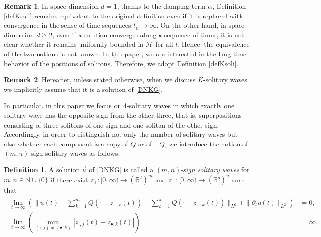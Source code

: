 \documentclass[reqno]{amsart}
\theoremstyle{plain}
\theoremstyle{definition}
\newtheorem{definition}{Definition}[section]
\newtheorem{remark}{Remark}[section]
\numberwithin{equation}{section}
\newcommand{\1}{\mathbbm{1}}
\begin{document}
\begin{remark}
In space dimension $d=1$, thanks to the damping term $\alpha$, Definition \ref{defKsoli} remains equivalent to the original definition even if it is replaced with convergence in the sense of time sequences $t_n\to\infty$. On the other hand, in space dimension $d\geq 2$, even if a solution converges along a sequence of times, it is not clear whether it remains uniformly bounded in $\mathcal{H}$ for all $t$. Hence, the equivalence of the two notions is not known. In this paper, we are interested in the long-time behavior of the positions of solitons. Therefore, we adopt Definition \ref{defKsoli}.
\end{remark}
\begin{remark}
Hereafter, unless stated otherwise, when we discuss $K$-solitary waves we implicitly assume that it is a solution of \eqref{DNKG}.
\end{remark}

In particular, in this paper we focus on 4-solitary waves in which exactly one solitary wave has the opposite sign from the other three, that is, superpositions consisting of three solitons of one sign and one soliton of the other sign. Accordingly, in order to distinguish not only the number of solitary waves but also whether each component is a copy of $Q$ or of $-Q$, we introduce the notion of $(m,n)$-sign solitary waves as follows.
\begin{definition}\label{defm,nsoli}
A solution $\vec{u}$ of \eqref{DNKG} is called a \textit{$(m,n)$-sign solitary waves} for $m,n\in\mathbb{N}\cup\{0\}$ if there exist $z_+:[0,\infty)\to (\mathbb{R}^d)^m$ and $z_-:[0,\infty)\to(\mathbb{R}^d)^n$ such that 
\begin{align}
\label{mnsoli}
\begin{aligned}
\lim_{t\to \infty} \left(\|u(t)-\sum_{k=1}^mQ(\cdot-z_{+,k}(t))+\sum_{k=1}^n Q(\cdot-z_{-,k}(t))\|_{H^1}+\|{\partial}_tu(t)\|_{L^2}\right)&=0,
\\
\lim_{t\to\infty}\left( \min_{(\circ,j)\neq (\bullet,k)}|z_{\circ,j}(t)-z_{\bullet,k}(t)|\right)&=\infty.
\end{aligned}
\end{align}
\end{definition}
\end{document}
